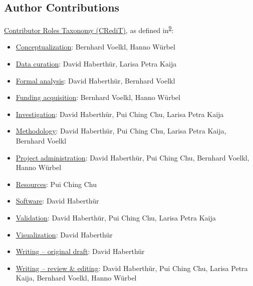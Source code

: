 \hypertarget{author-contributions}{%
\subsection{Author Contributions}\label{author-contributions}}

\href{https://credit.niso.org/}{Contributor Roles Taxonomy (CRediT)}, as defined in\textsuperscript{\protect\hyperlink{ref-11ofsO2hq}{9}}:

\begin{itemize}
\tightlist
\item
  \href{https://credit.niso.org/contributor-roles/conceptualization/}{Conceptualization}: Bernhard Voelkl, Hanno Würbel
\item
  \href{https://credit.niso.org/contributor-roles/data-curation/}{Data curation}: David Haberthür, Larisa Petra Kaija
\item
  \href{https://credit.niso.org/contributor-roles/formal-analysis/}{Formal analysis}: David Haberthür, Bernhard Voelkl
\item
  \href{https://credit.niso.org/contributor-roles/funding-acquisition/}{Funding acquisition}: Bernhard Voelkl, Hanno Würbel
\item
  \href{https://credit.niso.org/contributor-roles/investigation/}{Investigation}: David Haberthür, Pui Ching Chu, Larisa Petra Kaija
\item
  \href{https://credit.niso.org/contributor-roles/methodology/}{Methodology}: David Haberthür, Pui Ching Chu, Larisa Petra Kaija, Bernhard Voelkl
\item
  \href{https://credit.niso.org/contributor-roles/project-administration/}{Project administration}: David Haberthür, Pui Ching Chu, Bernhard Voelkl, Hanno Würbel
\item
  \href{https://credit.niso.org/contributor-roles/resources/}{Resources}: Pui Ching Chu
\item
  \href{https://credit.niso.org/contributor-roles/software/}{Software}: David Haberthür
\item
  \href{https://credit.niso.org/contributor-roles/validation/}{Validation}: David Haberthür, Pui Ching Chu, Larisa Petra Kaija
\item
  \href{https://credit.niso.org/contributor-roles/visualization/}{Visualization}: David Haberthür
\item
  \href{https://credit.niso.org/contributor-roles/writing---original-draft/}{Writing -- original draft}: David Haberthür
\item
  \href{https://credit.niso.org/contributor-roles/writing---review-\&-editing/}{Writing -- review \& editing}: David Haberthür, Pui Ching Chu, Larisa Petra Kaija, Bernhard Voelkl, Hanno Würbel
\end{itemize}

